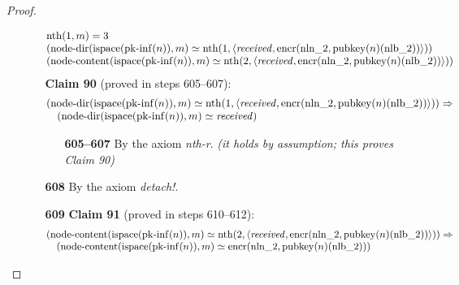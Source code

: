 \documentclass[11pt]{article}
\theoremstyle{plain}
\begin{document}
\begin{proof}
\begin{itemize}[leftmargin=2.8em, itemsep=4pt, parsep=1pt]
\begin{itemize}[leftmargin=2.8em, itemsep=4pt, parsep=1pt]
\begin{equation*}
\begin{array}{@{}l@{}}
\operatorname{nth}(1, m) = 3 \\
(\operatorname{node\text{-}dir}(\operatorname{ispace}(\operatorname{pk\text{-}inf}(n)), m) \simeq \operatorname{nth}(1, \langle \mathit{received}, \operatorname{encr}(\operatorname{nln\_2}, \operatorname{pubkey}(n)(\operatorname{nlb\_2})) \rangle)) \\
(\operatorname{node\text{-}content}(\operatorname{ispace}(\operatorname{pk\text{-}inf}(n)), m) \simeq \operatorname{nth}(2, \langle \mathit{received}, \operatorname{encr}(\operatorname{nln\_2}, \operatorname{pubkey}(n)(\operatorname{nlb\_2})) \rangle))
\end{array}
\end{equation*}
\textbf{Claim 90} (proved in steps 605--607):
\begin{equation*}
\begin{array}{@{}l@{}} (\operatorname{node\text{-}dir}(\operatorname{ispace}(\operatorname{pk\text{-}inf}(n)), m) \simeq \operatorname{nth}(1, \langle \mathit{received}, \operatorname{encr}(\operatorname{nln\_2}, \operatorname{pubkey}(n)(\operatorname{nlb\_2})) \rangle)) \Rightarrow  \\ \quad (\operatorname{node\text{-}dir}(\operatorname{ispace}(\operatorname{pk\text{-}inf}(n)), m) \simeq \mathit{received}) \end{array}
\end{equation*}

  \begin{itemize}[leftmargin=2.8em, itemsep=4pt, parsep=1pt]
  \item[\textbf{605--607}] By the axiom \emph{nth-r}.  \emph{(it holds by assumption; this proves Claim 90)}
  \end{itemize}
  \item[\textbf{608}] By the axiom \emph{detach!}.
  \item[\textbf{609}] \textbf{Claim 91} (proved in steps 610--612):
\begin{equation*}
\begin{array}{@{}l@{}} (\operatorname{node\text{-}content}(\operatorname{ispace}(\operatorname{pk\text{-}inf}(n)), m) \simeq \operatorname{nth}(2, \langle \mathit{received}, \operatorname{encr}(\operatorname{nln\_2}, \operatorname{pubkey}(n)(\operatorname{nlb\_2})) \rangle)) \Rightarrow  \\ \quad (\operatorname{node\text{-}content}(\operatorname{ispace}(\operatorname{pk\text{-}inf}(n)), m) \simeq \operatorname{encr}(\operatorname{nln\_2}, \operatorname{pubkey}(n)(\operatorname{nlb\_2}))) \end{array}
\end{equation*}


\end{itemize}
\end{itemize}
\end{proof}
\end{document}
